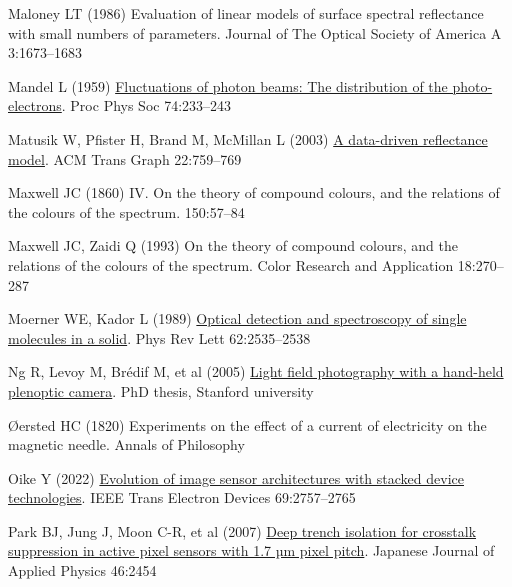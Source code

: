 \documentclass[
  letterpaper,
]{book}
\newlength{\cslhangindent}
\newenvironment{CSLReferences}[2] %
 {\begin{list}{}{%
  \setlength{\itemindent}{0pt}
  \setlength{\leftmargin}{0pt}
  \setlength{\parsep}{0pt}
  \ifodd #1
   \setlength{\leftmargin}{\cslhangindent}
   \setlength{\itemindent}{-1\cslhangindent}
  \fi
  \setlength{\itemsep}{#2\baselineskip}}}
 {\end{list}}
\begin{document}
\begin{CSLReferences}{1}{1}
Maloney LT (1986) Evaluation of linear models of surface spectral
reflectance with small numbers of parameters. Journal of The Optical
Society of America A 3:1673--1683

Mandel L (1959)
\href{http://dx.doi.org/10.1088/0370-1328/74/3/301}{Fluctuations of
photon beams: The distribution of the photo-electrons}. Proc Phys Soc
74:233--243

Matusik W, Pfister H, Brand M, McMillan L (2003)
\href{https://dl.acm.org/doi/10.1145/882262.882343}{A data-driven
reflectance model}. ACM Trans Graph 22:759--769

Maxwell JC (1860) {IV}. {On} the theory of compound colours, and the
relations of the colours of the spectrum. 150:57--84

Maxwell JC, Zaidi Q (1993) On the theory of compound colours, and the
relations of the colours of the spectrum. Color Research and Application
18:270--287

Moerner WE, Kador L (1989)
\href{http://dx.doi.org/10.1103/physrevlett.62.2535}{Optical detection
and spectroscopy of single molecules in a solid}. Phys Rev Lett
62:2535--2538

Ng R, Levoy M, Brédif M, et al (2005)
\href{'https://hal.science/hal-02551481'}{Light field photography with a
hand-held plenoptic camera}. PhD thesis, Stanford university

Øersted HC (1820) Experiments on the effect of a current of electricity
on the magnetic needle. Annals of Philosophy

Oike Y (2022)
\href{https://ieeexplore.ieee.org/abstract/document/9494712/}{Evolution
of image sensor architectures with stacked device technologies}. IEEE
Trans Electron Devices 69:2757--2765

Park BJ, Jung J, Moon C-R, et al (2007)
\href{http://dx.doi.org/10.1143/jjap.46.2454/meta}{Deep trench isolation
for crosstalk suppression in active pixel sensors with 1.7 µm pixel
pitch}. Japanese Journal of Applied Physics 46:2454


\end{CSLReferences}
\end{document}
